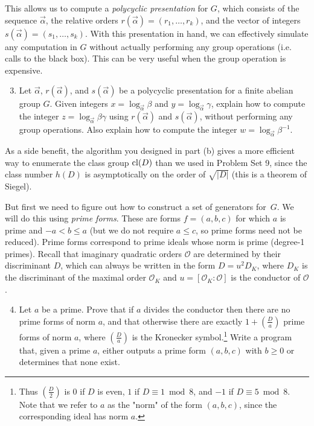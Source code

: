 \documentclass[11pt]{article}
\renewcommand{\O}{\mathcal{O}}
\newcommand{\cl}{{\rm cl}}
\theoremstyle{definition}
\begin{document}
This allows us to compute a \emph{polycyclic presentation} for $G$, which consists of the sequence $\vec{\alpha}$, the relative orders $r(\vec{\alpha})=(r_1,\ldots,r_k)$, and the vector of integers $s(\vec{\alpha})=(s_1,\ldots,s_k)$.
With this presentation in hand, we can effectively simulate any computation in $G$ without actually performing any group operations (i.e. calls to the black box).  This can be very useful when the group operation is expensive.

\begin{enumerate}[{\bf(a)}]
\setcounter{enumi}{2}
\item Let $\vec{\alpha}$, $r(\vec{\alpha})$, and $s(\vec{\alpha})$ be a polycyclic presentation for a finite abelian group $G$.
Given integers $x=\log_{\vec{\alpha}}\beta$ and $y=\log_{\vec{\alpha}}\gamma$, explain how to compute the integer $z=\log_{\vec{\alpha}}\beta\gamma$ using $r(\vec{\alpha})$ and $s(\vec{\alpha})$, without performing any group operations.
Also explain how to compute the integer $w=\log_{\vec{\alpha}}\beta^{-1}$.
\end{enumerate}

As a side benefit, the algorithm you designed in part (b) gives a more efficient way to enumerate the class group $\cl(D)$ than we used in Problem Set 9, since the class number $h(D)$ is asymptotically on the order of $\sqrt{|D|}$ (this is a theorem of Siegel).

But first we need to figure out how to construct a set of generators for~$G$.
We will do this using \emph{prime forms}.  These are forms $f=(a,b,c)$ for which $a$ is prime and $-a < b \le a$ (but we do not require $a\le c$, so prime forms need not be reduced).
Prime forms correspond to prime ideals whose norm is prime (degree-1 primes).
Recall that imaginary quadratic orders $\O$ are determined by their discriminant $D$, which can always be written in the form $D=u^2D_K$, where $D_K$ is the discriminant of the maximal order $\O_K$ and $u=[\O_K:\O]$ is the conductor of $\O$.
\begin{enumerate}[{\bf(a)}]
\setcounter{enumi}{3}
\item
Let $a$ be a prime.  Prove that if $a$ divides the conductor then there are no prime forms of norm $a$, and that otherwise there are exactly $1+(\frac{D}{a})$ prime forms of norm $a$, where $(\frac{D}{a})$ is the Kronecker symbol.\footnote{Thus $(\frac{D}{2})$ is 0 if $D$ is even, $1$ if $D\equiv 1\bmod 8$, and $-1$ if $D\equiv 5\bmod 8$.
Note that we refer to $a$ as the "norm" of the form $(a,b,c)$, since the corresponding ideal has norm $a$.}
Write a program that, given a prime $a$, either outputs a prime form $(a,b,c)$ with $b\ge 0$ or determines that none exist.
\end{enumerate}
\end{document}
